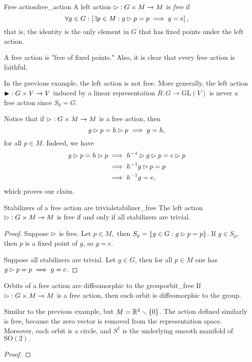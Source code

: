 \begin{definition}{Free action}{free_action}
    A left action \(\mathbin{\vartriangleright} : G \times M \to M\) is \emph{free} if
    \begin{equation*}
        \forall g \in G : \left[\exists p \in M : g \mathbin{\vartriangleright} p = p \implies g = e\right],
    \end{equation*}
    that is, the identity is the only element in \(G\) that has fixed points under the left action.
\end{definition}
\begin{remark}
    A free action is "free of fixed points." Also, it is clear that every free action is faithful.
\end{remark}
\begin{example}
    In the previous example, the left action is not free. More generally, the left action \(\mathbin{\blacktriangleright} : G \times V \to V\) induced by a linear representation \(R : G \to \mathrm{GL}(V)\) is never a free action since \(S_0 = G.\)
\end{example}
Notice that if \(\mathbin{\vartriangleright} : G \times M \to M\) is a free action, then
\begin{equation*}
    g \mathbin{\vartriangleright} p = h \mathbin{\vartriangleright} p \implies g = h,
\end{equation*}
for all \(p \in M\). Indeed, we have
\begin{align*}
    g \mathbin{\vartriangleright} p = h \mathbin{\vartriangleright} p &\implies h^{-1} \mathbin{\vartriangleright} g \mathbin{\vartriangleright} p = e \mathbin{\vartriangleright} p\\
                          &\implies h^{-1}g \mathbin{\vartriangleright} p = p\\
                          &\implies h^{-1}g = e,
\end{align*}
which proves our claim.

\begin{proposition}{Stabilizers of a free action are trivial}{stabilizer_free}
    The left action \(\mathbin{\vartriangleright} : G \times M \to M\) is free if and only if all stabilizers are trivial.
\end{proposition}
\begin{proof}
    Suppose \(\mathbin{\vartriangleright}\) is free. Let \(p \in M,\) then \(S_p = \{g \in G : g \mathbin{\vartriangleright} p = p\}\). If \(g \in S_p,\) then \(p\) is a fixed point of \(g\), so \(g = e.\)

    Suppose all stabilizers are trivial. Let \(g \in G\), then for all \(p \in M\) one has \(g \mathbin{\vartriangleright} p = p \implies g = e\).
\end{proof}

\begin{proposition}{Orbits of a free action are diffeomorphic to the group}{orbit_free}
    If \(\mathbin{\vartriangleright} : G \times M \to M\) is a free action, then each orbit is diffeomorphic to the group.
\end{proposition}
\begin{example}
    Similar to the previous example, but \(M = \mathbb{R}^2 \smallsetminus \{0\}\). The action defined similarly is free, because the zero vector is removed from the representation space. Moreover, each orbit is a circle, and \(S^1\) is the underlying smooth manifold of \(\mathrm{SO}(2).\)
\end{example}
\begin{proof}
    \todo
\end{proof}

